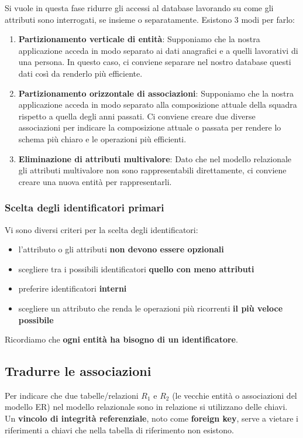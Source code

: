\documentclass[11pt, a4paper, titlepage, oneside]{scrbook}
\begin{document}
Si vuole in questa fase ridurre gli accessi al database lavorando su come gli attributi sono interrogati, se insieme o separatamente. Esistono 3 modi per farlo:
\begin{enumerate}
    \item \textbf{Partizionamento verticale di entità}: Supponiamo che la nostra applicazione acceda in modo separato ai dati anagrafici e a quelli lavorativi di una persona. In questo caso, ci conviene separare nel nostro database questi dati così da renderlo più efficiente.
    \item \textbf{Partizionamento orizzontale di associazioni}: Supponiamo che la nostra applicazione acceda in modo separato alla composizione attuale della squadra rispetto a quella degli anni passati. Ci conviene creare due diverse associazioni per indicare la composizione attuale o passata per rendere lo schema più chiaro e le operazioni più efficienti. 
    \item \textbf{Eliminazione di attributi multivalore}: Dato che nel modello relazionale gli attributi multivalore non sono rappresentabili direttamente, ci conviene creare una nuova entità per rappresentarli.
\end{enumerate}

\subsubsection*{Scelta degli identificatori primari}

Vi sono diversi criteri per la scelta degli identificatori:
\begin{itemize}
    \item l'attributo o gli attributi \textbf{non devono essere opzionali}
    \item scegliere tra i possibili identificatori \textbf{quello con meno attributi}
    \item preferire identificatori \textbf{interni}
    \item scegliere un attributo che renda le operazioni più ricorrenti \textbf{il più veloce possibile}
\end{itemize}

\NB Ricordiamo che \textbf{ogni entità ha bisogno di un identificatore}.

\subsection{Tradurre le associazioni}

\begin{Definizione}
\label{def-vincolo-integrità-referenziale}
Per indicare che due tabelle/relazioni $R_1$ e $R_2$ (le vecchie entità o associazioni del modello ER) nel modello relazionale sono in relazione si utilizzano delle chiavi. Un \textbf{vincolo di integrità referenziale}, noto come \textbf{foreign key}, serve a vietare i riferimenti a chiavi che nella tabella di riferimento non esistono.
\end{Definizione}
\end{document}
